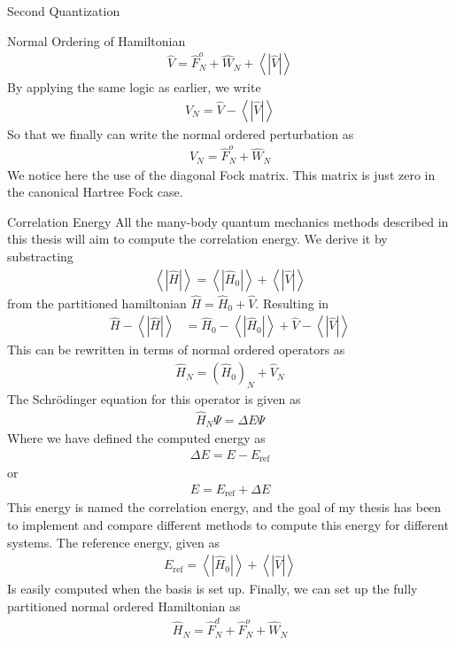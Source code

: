 \documentclass[twoside,english]{uiofysmaster}
\begin{document}
\begin{chapter}{Second Quantization}
\begin{section}{Normal Ordering of Hamiltonian}
		\begin{align}
			\hat V = \hat F_N^o + \hat W_N + \left< \right. | \hat V | \left. \right>
		\end{align}
		By applying the same logic as earlier, we write
		\begin{align}
			\hat V_N = \hat V - \left< \right. | \hat V | \left. \right>
		\end{align}
		So that we finally can write the normal ordered perturbation as
		\begin{align}
			\hat V_N = \hat F_N^o + \hat W_N
		\end{align}
		We notice here the use of the diagonal Fock matrix. This matrix is just zero in the canonical Hartree Fock case. 
	\end{section}

	\begin{section}{Correlation Energy}
		All the many-body quantum mechanics methods described in this thesis will aim to compute the correlation energy. We derive it by substracting 
		\begin{align}
			\left< \right. | \hat H | \left. \right> = \left< \right. | \hat H_0 | \left. \right> + \left< \right. | \hat V | \left. \right>
		\end{align}
		from the partitioned hamiltonian $\hat H = \hat H_0 + \hat V$. Resulting in
		\begin{align}
			\hat H - \left< \right. | \hat H | \left. \right> &= \hat H_0 - \left< \right. | \hat H_0 | \left. \right> + \hat V - \left< \right. |\hat V| \left. \right>
		\end{align}
		This can be rewritten in terms of normal ordered operators as 
		\begin{align}
			\hat H_N = (\hat H_0)_N + \hat V_N
		\end{align}
		The Schr\"{o}dinger equation for this operator is given as
		\begin{align}
			\hat H_N \Psi = \Delta E \Psi 
		\end{align}
		Where we have defined the computed energy as
		\begin{align}
			\Delta E = E - E_{\text{ref}}
		\end{align}
		or 
		\begin{align}
			E = E_{\text{ref}} + \Delta E
		\end{align}
		This energy is named the correlation energy, and the goal of my thesis has been to implement and compare different methods to compute this energy for different systems. The reference energy, given as
		\begin{align}
			E_{\text{ref}} = \left< \right. | \hat H_0 | \left. \right> + \left< \right. | \hat V | \left. \right>
		\end{align}
		Is easily computed when the basis is set up. Finally, we can set up the fully partitioned normal ordered Hamiltonian as
		\begin{align}
			\hat H_N = \hat F_N^d + \hat F_N^o + \hat W_N
		\end{align}


\end{section}
\end{chapter}
\end{document}

